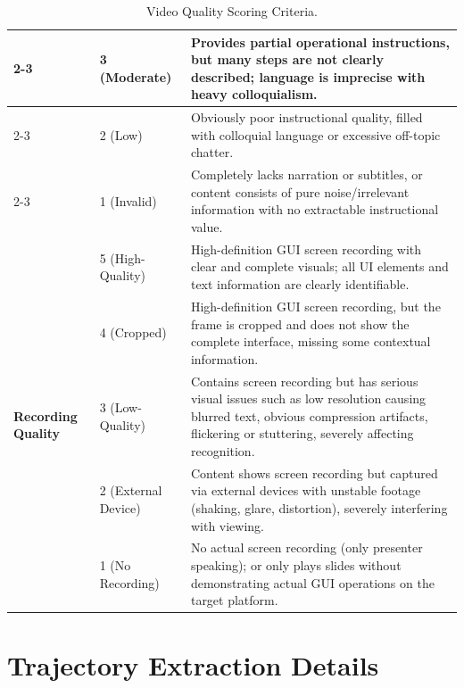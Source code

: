 \documentclass{llmxive}
\begin{document}
\begin{table}[htbp]
\begin{tabular}{llp{10cm}}
\cmidrule{2-3}
& 3 (Moderate) & Provides partial operational instructions, but many steps are not clearly described; language is imprecise with heavy colloquialism. \\
\cmidrule{2-3}
& 2 (Low) & Obviously poor instructional quality, filled with colloquial language or excessive off-topic chatter. \\
\cmidrule{2-3}
& 1 (Invalid) & Completely lacks narration or subtitles, or content consists of pure noise/irrelevant information with no extractable instructional value. \\
\midrule
\multirow{10}{*}{\textbf{Recording Quality}}
& 5 (High-Quality) & High-definition GUI screen recording with clear and complete visuals; all UI elements and text information are clearly identifiable. \\
\cmidrule{2-3}
& 4 (Cropped) & High-definition GUI screen recording, but the frame is cropped and does not show the complete interface, missing some contextual information. \\
\cmidrule{2-3}
& 3 (Low-Quality) & Contains screen recording but has serious visual issues such as low resolution causing blurred text, obvious compression artifacts, flickering or stuttering, severely affecting recognition. \\
\cmidrule{2-3}
& 2 (External Device) & Content shows screen recording but captured via external devices with unstable footage (shaking, glare, distortion), severely interfering with viewing. \\
\cmidrule{2-3}
& 1 (No Recording) & No actual screen recording (only presenter speaking); or only plays slides without demonstrating actual GUI operations on the target platform. \\
\bottomrule
\end{tabular}
\caption{Video Quality Scoring Criteria.}
\label{tab: video_scoring_criteria}
\end{table}

\section{Trajectory Extraction Details}
\label{sec: trajectory extraction}
\end{document}
